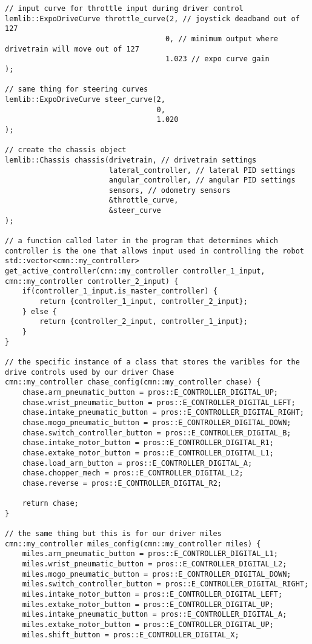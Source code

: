 \begin{verbatim}
// input curve for throttle input during driver control
lemlib::ExpoDriveCurve throttle_curve(2, // joystick deadband out of 127
                                     0, // minimum output where drivetrain will move out of 127
                                     1.023 // expo curve gain
);

// same thing for steering curves
lemlib::ExpoDriveCurve steer_curve(2, 
                                   0,
                                   1.020
);

// create the chassis object
lemlib::Chassis chassis(drivetrain, // drivetrain settings
                        lateral_controller, // lateral PID settings
                        angular_controller, // angular PID settings
                        sensors, // odometry sensors
                        &throttle_curve,
                        &steer_curve
);

// a function called later in the program that determines which controller is the one that allows input used in controlling the robot
std::vector<cmn::my_controller> get_active_controller(cmn::my_controller controller_1_input, cmn::my_controller controller_2_input) {
    if(controller_1_input.is_master_controller) {
        return {controller_1_input, controller_2_input};
    } else {
        return {controller_2_input, controller_1_input};
    }
}

// the specific instance of a class that stores the varibles for the drive controls used by our driver Chase
cmn::my_controller chase_config(cmn::my_controller chase) {
    chase.arm_pneumatic_button = pros::E_CONTROLLER_DIGITAL_UP;
    chase.wrist_pneumatic_button = pros::E_CONTROLLER_DIGITAL_LEFT;
    chase.intake_pneumatic_button = pros::E_CONTROLLER_DIGITAL_RIGHT;
    chase.mogo_pneumatic_button = pros::E_CONTROLLER_DIGITAL_DOWN;
    chase.switch_controller_button = pros::E_CONTROLLER_DIGITAL_B;
    chase.intake_motor_button = pros::E_CONTROLLER_DIGITAL_R1;
    chase.extake_motor_button = pros::E_CONTROLLER_DIGITAL_L1;
    chase.load_arm_button = pros::E_CONTROLLER_DIGITAL_A;
    chase.chopper_mech = pros::E_CONTROLLER_DIGITAL_L2;
    chase.reverse = pros::E_CONTROLLER_DIGITAL_R2;

    return chase;
}

// the same thing but this is for our driver miles
cmn::my_controller miles_config(cmn::my_controller miles) {
    miles.arm_pneumatic_button = pros::E_CONTROLLER_DIGITAL_L1;
    miles.wrist_pneumatic_button = pros::E_CONTROLLER_DIGITAL_L2;
    miles.mogo_pneumatic_button = pros::E_CONTROLLER_DIGITAL_DOWN;
    miles.switch_controller_button = pros::E_CONTROLLER_DIGITAL_RIGHT;
    miles.intake_motor_button = pros::E_CONTROLLER_DIGITAL_LEFT;
    miles.extake_motor_button = pros::E_CONTROLLER_DIGITAL_UP;
    miles.intake_pneumatic_button = pros::E_CONTROLLER_DIGITAL_A;
    miles.extake_motor_button = pros::E_CONTROLLER_DIGITAL_UP;
    miles.shift_button = pros::E_CONTROLLER_DIGITAL_X;


\end{verbatim}

